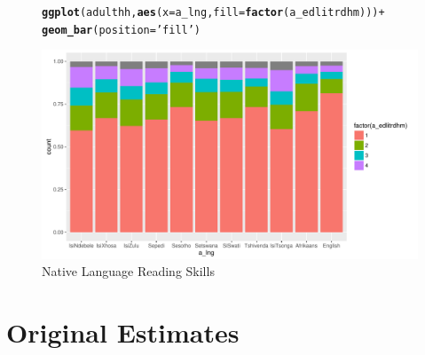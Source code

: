 \documentclass[a4paper,british]{article}\usepackage[]{graphicx}\usepackage[]{color}
\makeatletter
\def\maxwidth{ %
  \ifdim\Gin@nat@width>\linewidth
    \linewidth
  \else
    \Gin@nat@width
  \fi
}
\newcommand{\hlstr}[1]{\textcolor[rgb]{0.192,0.494,0.8}{#1}}%
\newcommand{\hlopt}[1]{\textcolor[rgb]{0,0,0}{#1}}%
\newcommand{\hlstd}[1]{\textcolor[rgb]{0.345,0.345,0.345}{#1}}%
\newcommand{\hlkwc}[1]{\textcolor[rgb]{0.333,0.667,0.333}{#1}}%
\newcommand{\hlkwd}[1]{\textcolor[rgb]{0.737,0.353,0.396}{\textbf{#1}}}%
\newenvironment{kframe}{%
 \def\at@end@of@kframe{}%
 \ifinner\ifhmode%
  \def\at@end@of@kframe{\end{minipage}}%
  \begin{minipage}{\columnwidth}%
 \fi\fi%
 \def\FrameCommand##1{\hskip\@totalleftmargin \hskip-\fboxsep
 \colorbox{shadecolor}{##1}\hskip-\fboxsep
     \hskip-\linewidth \hskip-\@totalleftmargin \hskip\columnwidth}%
 \MakeFramed {\advance\hsize-\width
   \@totalleftmargin\z@ \linewidth\hsize
   \@setminipage}}%
 {\par\unskip\endMakeFramed%
 \at@end@of@kframe}
\newenvironment{knitrout}{}{} %
\makeatother
\begin{document}
\begin{figure}[H]
\caption{Native Language Reading Skills}
\label{fig:rdhm}

\begin{knitrout}
\color{fgcolor}\begin{kframe}
\begin{alltt}
\hlkwd{ggplot}\hlstd{(adulthh,} \hlkwd{aes}\hlstd{(}\hlkwc{x} \hlstd{= a_lng,} \hlkwc{fill} \hlstd{=} \hlkwd{factor}\hlstd{(a_edlitrdhm)) )} \hlopt{+}
        \hlkwd{geom_bar}\hlstd{(}\hlkwc{position} \hlstd{=} \hlstr{'fill'}\hlstd{)}
\end{alltt}
\end{kframe}
\includegraphics[width=\maxwidth]{../misc/latex-read_native-1} 

\end{knitrout}
\end{figure}


\section{Original Estimates}
\end{document}
